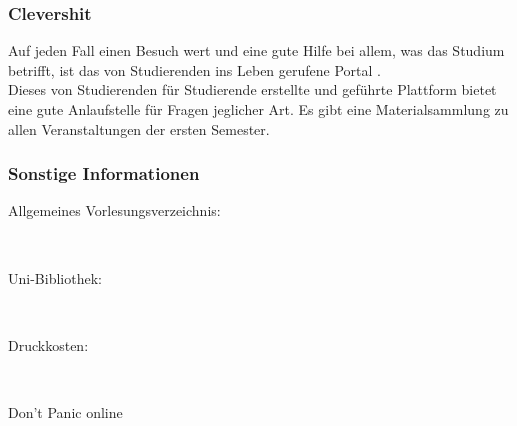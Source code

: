 	\subsubsection{Clevershit}

		Auf jeden Fall einen Besuch wert und eine gute Hilfe bei allem, was das Studium betrifft, ist das von Studierenden ins Leben gerufene Portal \mbox{}.\\
		Dieses von Studierenden für Studierende erstellte und geführte Plattform bietet eine gute Anlaufstelle für Fragen jeglicher Art. Es gibt eine Materialsammlung zu allen Veranstaltungen der ersten Semester.

\subsubsection*{Sonstige Informationen}
	\begin{description}
		\item[Allgemeines Vorlesungsverzeichnis:] ~\\
			{\footnotesize{}}
		\item[Uni-Bibliothek:] ~\\
			{\footnotesize{}}
		\item[Druckkosten:] ~\\
			{\footnotesize{}}
		\item[Don't Panic online] ~\\
			{\footnotesize{}}
	\end{description}

